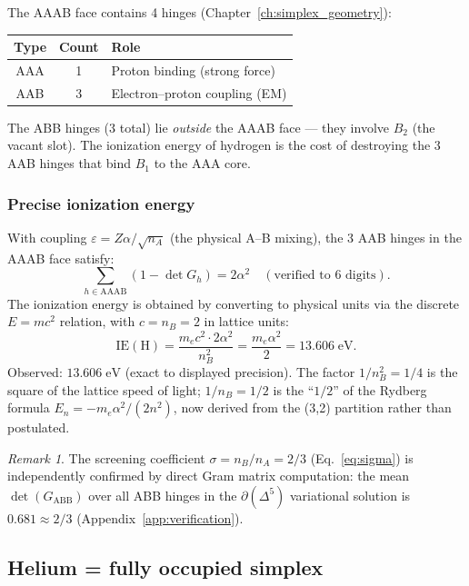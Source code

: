 \documentclass[12pt]{article}
\theoremstyle{remark}
\newtheorem{remark}[theorem]{Remark}
\theoremstyle{definition}
\begin{document}
The AAAB face contains 4 hinges (Chapter~\ref{ch:simplex_geometry}):
\begin{center}
\begin{tabular}{ccl}
\hline
Type & Count & Role \\
\hline
AAA & 1 & Proton binding (strong force) \\
AAB & 3 & Electron--proton coupling (EM) \\
\hline
\end{tabular}
\end{center}

The ABB hinges (3 total) lie \emph{outside} the AAAB face --- they involve $B_2$ (the vacant slot). The ionization energy of hydrogen is the cost of destroying the 3 AAB hinges that bind $B_1$ to the AAA core.

\subsubsection{Precise ionization energy}

With coupling $\varepsilon = Z\alpha/\sqrt{n_A}$ (the physical A--B mixing), the 3 AAB hinges in the AAAB face satisfy:
\begin{equation}
\sum_{h \in \mathrm{AAAB}}(1 - \det G_h) = 2\alpha^2
\quad (\text{verified to 6 digits}).
\end{equation}
The ionization energy is obtained by converting to physical units via the discrete $E = mc^2$ relation, with $c = n_B = 2$ in lattice units:
\begin{equation}
\boxed{\text{IE}(\text{H}) = \frac{m_e c^2 \cdot 2\alpha^2}{n_B^2} = \frac{m_e \alpha^2}{2} = 13.606\;\text{eV}.}
\end{equation}
Observed: $13.606\;\text{eV}$ (exact to displayed precision).  The factor $1/n_B^2 = 1/4$ is the square of the lattice speed of light; $1/n_B = 1/2$ is the ``$1/2$'' of the Rydberg formula $E_n = -m_e\alpha^2/(2n^2)$, now derived from the (3,2) partition rather than postulated.

\begin{remark}
The screening coefficient $\sigma = n_B/n_A = 2/3$ (Eq.~\ref{eq:sigma}) is independently confirmed by direct Gram matrix computation: the mean $\det(G_\mathrm{ABB})$ over all ABB hinges in the $\partial(\Delta^5)$ variational solution is $0.681 \approx 2/3$ (Appendix~\ref{app:verification}).
\end{remark}

\subsection{Helium = fully occupied simplex}
\end{document}
